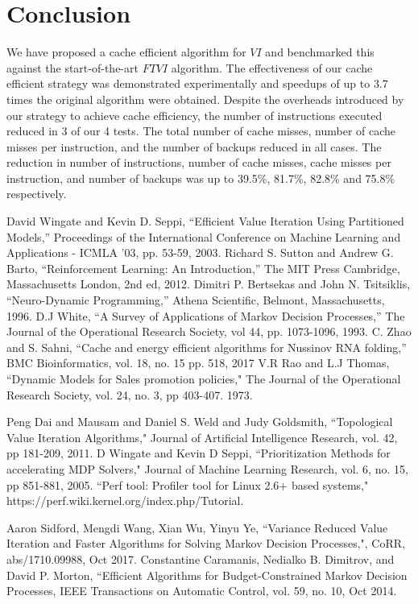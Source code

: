 \documentclass[conference]{IEEEtran}
\begin{document}
\section{Conclusion}
\label{sec:conc}
We have proposed a cache efficient algorithm for $VI$ and benchmarked this against the start-of-the-art $FTVI$ algorithm. The effectiveness of our cache efficient strategy was demonstrated experimentally and speedups of up to $3.7$ times the original algorithm were obtained. Despite the overheads introduced by our strategy to achieve cache efficiency, the number of instructions executed reduced in 3 of our 4 tests. The total number of cache misses, number of cache misses per instruction, and the number of backups reduced in all cases. The reduction in number of instructions, number of cache misses, cache misses per instruction, and number of backups was up to 39.5\%, 81.7\%, 82.8\% and 75.8\% respectively.

\begin{thebibliography}{00}
 David Wingate and Kevin D. Seppi, ``Efficient Value Iteration Using Partitioned Models,'' Proceedings of the International Conference on Machine Learning and Applications - ICMLA '03, pp. 53-59, 2003.
 Richard S. Sutton and Andrew G. Barto, ``Reinforcement Learning: An Introduction,'' The MIT Press Cambridge, Massachusetts London, 2nd ed, 2012.
 Dimitri P. Bertsekas and John N. Tsitsiklis, ``Neuro-Dynamic Programming,'' Athena Scientific, Belmont, Massachusetts, 1996.
 D.J White, ``A Survey of Applications of Markov Decision Processes,'' The Journal of the Operational Research Society, vol 44, pp. 1073-1096, 1993.
 C. Zhao and S. Sahni, ``Cache and energy efficient algorithms for Nussinov RNA folding,'' BMC Bioinformatics, vol. 18, no. 15 pp. 518, 2017
 V.R Rao and L.J Thomas, ``Dynamic Models for Sales promotion policies," The Journal of the Operational Research Society, vol. 24, no. 3, pp 403-407. 1973.

 Peng Dai and Mausam and Daniel S. Weld and Judy Goldsmith, ``Topological Value Iteration Algorithms," Journal of Artificial Intelligence Research, vol. 42, pp 181-209, 2011.
 D Wingate and Kevin D Seppi, ``Prioritization Methods for accelerating MDP Solvers," Journal of Machine Learning Research, vol. 6, no. 15, pp 851-881, 2005.
 ``Perf tool: Profiler tool for Linux 2.6+ based systems," https://perf.wiki.kernel.org/index.php/Tutorial.

 Aaron Sidford, Mengdi Wang, Xian Wu, Yinyu Ye, ``Variance Reduced Value Iteration and Faster Algorithms for Solving Markov Decision Processes,", CoRR, abs/1710.09988, Oct 2017.
 Constantine Caramanis, Nedialko B. Dimitrov, and David P. Morton, ``Efficient Algorithms for Budget-Constrained Markov Decision Processes, IEEE Transactions on Automatic Control, vol. 59, no. 10, Oct 2014.


\end{thebibliography}


%
%
\end{document}
